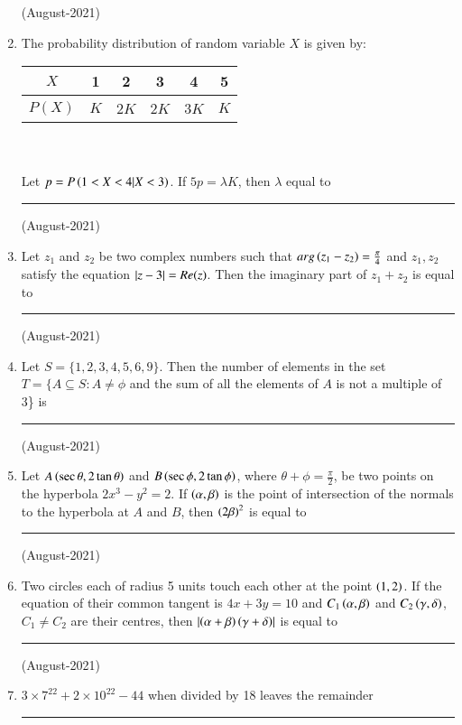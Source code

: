 \documentclass[journal]{IEEEtran}
\begin{document}
\begin{enumerate}
    \hfill (August-2021) 
    
    \item The probability distribution of random variable $X$ is given by: \\
    \begin{tabular}[12pt]{ |c| c| c|c|c|c|}
    \hline
    $X$ & 1 & 2 & 3 & 4 & 5 \\
    \hline
    $P(X)$ & $K$ & 2$K$ & 2$K$ & 3$K$ & $K$ \\
    \hline 
    \end{tabular} \\ \\
    Let $p = P \left(1 < X < 4 | X < 3\right)$. If $5p = \lambda K$, then $\lambda$ equal to \rule{1.5cm}{0.15mm} 
    
    \hfill(August-2021) 
    
    \item Let $z_1$ and $z_2$ be two complex numbers such that $arg\left(z_1 - z_2\right) = \frac{\pi}{4}$ 
 and $z_1, z_2$ satisfy the equation $\left\vert z -
 3 \right\vert= Re(z)$. Then the imaginary part of $z_1 + z_2$ is equal to \rule{1cm}{0.15mm}
 
 \hfill(August-2021)
 
 \item Let $S = \{1, 2, 3, 4, 5, 6, 9\}$. Then the number of elements in the set $T = \{A\subseteq 
 S : A \neq \phi $ and the sum of all the elements of $A$ is not a multiple of 3\} is \rule{1cm}{0.15mm} 
 
     \hfill(August-2021)
     
    \item Let $A\left(\sec \theta, 2\tan \theta\right)$ and $B \left(\sec \phi, 2 \tan \phi\right)$, where $\theta + \phi = \frac{\pi}{2}$, be two points on the hyperbola $2x^3 - y^2 = 2$. If $\left(\alpha, \beta\right)$ is the point of intersection of the normals to the hyperbola at $A$ and $B$, then $\left(2\beta\right)^2$ is equal to \rule{1.5cm}{0.15mm}
    
    \hfill (August-2021)
    
    \item Two circles each of radius 5 units touch each other at the point $\left(1,2\right)$. If the equation of their common tangent is $4x + 3y = 10$ and $C_1 \left(\alpha,\beta\right)$ and $C_2 \left(\gamma, \delta\right)$, $C_1 \neq C_2$ are their centres, then $\left\vert\left(\alpha+\beta\right)\left(\gamma+\delta\right)\right\vert$
    is equal to \rule{1cm}{0.15mm}
    
    \hfill (August-2021)
    
    \item $3 \times 7^{22} + 2 \times 10^{22} - 44$ when divided by 18 leaves the remainder \rule{1cm}{0.15mm} 
    

\end{enumerate}
\end{document}
